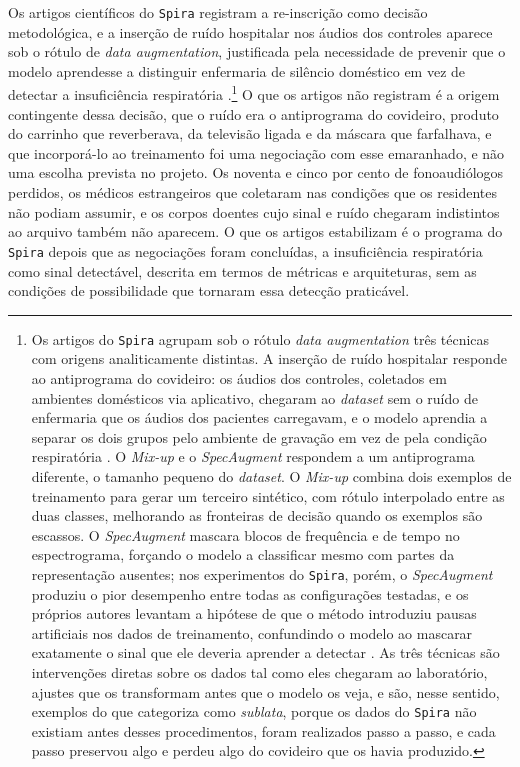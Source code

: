 Os artigos científicos do \texttt{Spira} registram a re-inscrição como decisão metodológica, e a inserção de ruído hospitalar nos áudios dos controles aparece sob o rótulo de \textit{data augmentation}, justificada pela necessidade de prevenir que o modelo aprendesse a distinguir enfermaria de silêncio doméstico em vez de detectar a insuficiência respiratória \parencite{Casanova2021DeepLearning}.\footnote{Os artigos do \texttt{Spira} agrupam sob o rótulo \textit{data augmentation} três técnicas com origens analiticamente distintas. A inserção de ruído hospitalar responde ao antiprograma do covideiro: os áudios dos controles, coletados em ambientes domésticos via aplicativo, chegaram ao \textit{dataset} sem o ruído de enfermaria que os áudios dos pacientes carregavam, e o modelo aprendia a separar os dois grupos pelo ambiente de gravação em vez de pela condição respiratória \parencite{Casanova2021DeepLearning}. O \textit{Mix-up} e o \textit{SpecAugment} respondem a um antiprograma diferente, o tamanho pequeno do \textit{dataset}. O \textit{Mix-up} combina dois exemplos de treinamento para gerar um terceiro sintético, com rótulo interpolado entre as duas classes, melhorando as fronteiras de decisão quando os exemplos são escassos. O \textit{SpecAugment} mascara blocos de frequência e de tempo no espectrograma, forçando o modelo a classificar mesmo com partes da representação ausentes; nos experimentos do \texttt{Spira}, porém, o \textit{SpecAugment} produziu o pior desempenho entre todas as configurações testadas, e os próprios autores levantam a hipótese de que o método introduziu pausas artificiais nos dados de treinamento, confundindo o modelo ao mascarar exatamente o sinal que ele deveria aprender a detectar \parencite{Casanova2021DeepLearning}. As três técnicas são intervenções diretas sobre os dados tal como eles chegaram ao laboratório, ajustes que os transformam antes que o modelo os veja, e são, nesse sentido, exemplos do que \textcite{Latour2017Esperanca} categoriza como \textit{sublata}, porque os dados do \texttt{Spira} não existiam antes desses procedimentos, foram realizados passo a passo, e cada passo preservou algo e perdeu algo do covideiro que os havia produzido.} O que os artigos não registram é a origem contingente dessa decisão, que o ruído era o antiprograma do covideiro, produto do carrinho que reverberava, da televisão ligada e da máscara que farfalhava, e que incorporá-lo ao treinamento foi uma negociação com esse emaranhado, e não uma escolha prevista no projeto. Os noventa e cinco por cento de fonoaudiólogos perdidos, os médicos estrangeiros que coletaram nas condições que os residentes não podiam assumir, e os corpos doentes cujo sinal e ruído chegaram indistintos ao arquivo também não aparecem. O que os artigos estabilizam é o programa do \texttt{Spira} depois que as negociações foram concluídas, a insuficiência respiratória como sinal detectável, descrita em termos de métricas e arquiteturas, sem as condições de possibilidade que tornaram essa detecção praticável.

